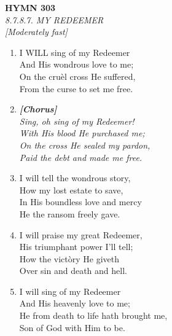 \documentclass[11pt,a4paper]{article}
\begin{document}
\newpage
\begin{center}
    {\Large \textbf{HYMN 303}}
    \\
    \textit{8.7.8.7. MY REDEEMER}
    \\
    \textit{\small [Moderately fast]}
\end{center}
\vspace{1em}

\begin{enumerate}
    \item I WILL sing of my Redeemer \\
        And His wondrous love to me; \\
        On the cru\`el cross He suffered, \\
        From the curse to set me free.

    \item[] \vspace{0.4em}
    \textbf{\textit{[Chorus]}} \\
    \textit{Sing, oh sing of my Redeemer!} \\
    \textit{With His blood He purchased me;} \\
    \textit{On the cross He sealed my pardon,} \\
    \textit{Paid the debt and made me free.}
    \vspace{0.4em}

    \item I will tell the wondrous story, \\
        How my lost estate to save, \\
        In His boundless love and mercy \\
        He the ransom freely gave.

    \item I will praise my great Redeemer, \\
        His triumphant power I'll tell; \\
        How the vict\`ory He giveth \\
        Over sin and death and hell.

    \item I will sing of my Redeemer \\
        And His heavenly love to me; \\
        He from death to life hath brought me, \\
        Son of God with Him to be.

\end{enumerate}
\end{document}
